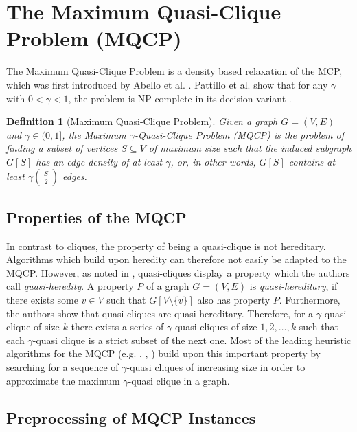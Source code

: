 \documentclass[draft,final]{vutinfth} %
\newtheorem{definition}{Definition}[section]
\begin{document}
\section{The Maximum Quasi-Clique Problem (MQCP)}\label{sec:mqcp}

The Maximum Quasi-Clique Problem is a density based relaxation of the MCP, which was first introduced by Abello et al. \cite{Abello2002}. Pattillo et al. show that for any $\gamma$ with $0 < \gamma < 1$, the problem is NP-complete in its decision variant \cite{pattillo_maximum_2013}. 

\begin{definition}[Maximum Quasi-Clique Problem]
	\label{def:mqcp}
	Given a graph $G = (V,E)$ and $\gamma \in (0,1]$, the Maximum $\gamma$-Quasi-Clique Problem (MQCP) is the problem of finding a subset of vertices $S \subseteq V$ of maximum size 
	such that the induced subgraph $G[S]$ has an edge density of at least $\gamma$, or, in other words, $G[S]$ contains at least $\gamma \binom{|S|}{2}$ edges. 
\end{definition}

\subsection{Properties of the MQCP}
In contrast to cliques, the property of being a quasi-clique is not hereditary. Algorithms which build upon heredity can therefore not easily be adapted to the MQCP. However, as noted in \cite{pattillo_maximum_2013}, quasi-cliques display a property which the authors call \textit{quasi-heredity}. A property $P$ of a graph $G = (V, E)$ is \textit{quasi-hereditary}, if there exists some $v \in V$ such that $G[V \setminus \{v\}]$ also has property $P$. Furthermore, the authors show that quasi-cliques are quasi-hereditary. Therefore, for a $\gamma$-quasi-clique of size $k$ there exists a series of $\gamma$-quasi cliques of size $1,2, \dots, k$ such that each $\gamma$-quasi clique is a strict subset of the next one. Most of the leading heuristic algorithms for the MQCP (e.g. \cite{djeddi_extension_2019}, \cite{zhou_opposition-based_2020}, \cite{chen_nuqclq_2021}) build upon this important property by searching for a sequence of $\gamma$-quasi cliques of increasing size in order to approximate the maximum $\gamma$-quasi clique in a graph. 

\subsection{Preprocessing of MQCP Instances}
\end{document}
